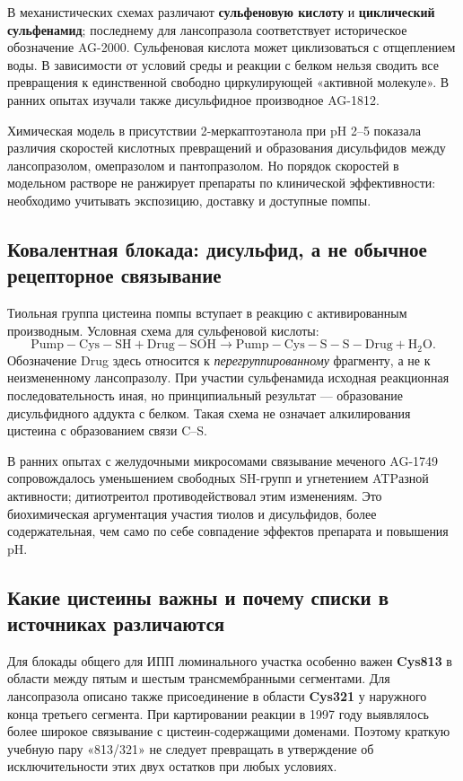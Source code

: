 \documentclass[11pt,a4paper,notitlepage]{report}
\newcommand{\src}[1]{\unskip\space\cite{#1}}
\begin{document}
В механистических схемах различают \textbf{сульфеновую кислоту} и \textbf{циклический сульфенамид}; последнему для лансопразола соответствует историческое обозначение AG-2000. Сульфеновая кислота может циклизоваться с отщеплением воды. В зависимости от условий среды и реакции с белком нельзя сводить все превращения к единственной свободно циркулирующей «активной молекуле». В ранних опытах изучали также дисульфидное производное AG-1812.\src{molnagaya89,molkinetics}

Химическая модель в присутствии 2-меркаптоэтанола при pH 2--5 показала различия скоростей кислотных превращений и образования дисульфидов между лансопразолом, омепразолом и пантопразолом. Но порядок скоростей в модельном растворе не ранжирует препараты по клинической эффективности: необходимо учитывать экспозицию, доставку и доступные помпы.\src{molkinetics}

\subsection{Ковалентная блокада: дисульфид, а не обычное рецепторное связывание}
Тиольная группа цистеина помпы вступает в реакцию с активированным производным. Условная схема для сульфеновой кислоты:
\[
\mathrm{Pump{-}Cys{-}SH}+\mathrm{Drug{-}SOH}
\longrightarrow
\mathrm{Pump{-}Cys{-}S{-}S{-}Drug}+\mathrm{H_2O}.
\]
Обозначение Drug здесь относится к \emph{перегруппированному} фрагменту, а не к неизмененному лансопразолу. При участии сульфенамида исходная реакционная последовательность иная, но принципиальный результат --- образование дисульфидного аддукта с белком. Такая схема не означает алкилирования цистеина с образованием связи C--S.\src{molnagaya89,molcys}

В ранних опытах с желудочными микросомами связывание меченого AG-1749 сопровождалось уменьшением свободных SH-групп и угнетением ATPазной активности; дитиотреитол противодействовал этим изменениям. Это биохимическая аргументация участия тиолов и дисульфидов, более содержательная, чем само по себе совпадение эффектов препарата и повышения pH.\src{molnagaya89}

\subsection{Какие цистеины важны и почему списки в источниках различаются}
Для блокады общего для ИПП люминального участка особенно важен \textbf{Cys813} в области между пятым и шестым трансмембранными сегментами. Для лансопразола описано также присоединение в области \textbf{Cys321} у наружного конца третьего сегмента. При картировании реакции в 1997 году выявлялось более широкое связывание с цистеин-содержащими доменами. Поэтому краткую учебную пару «813/321» не следует превращать в утверждение об исключительности этих двух остатков при любых условиях.\src{molcys}
\end{document}
